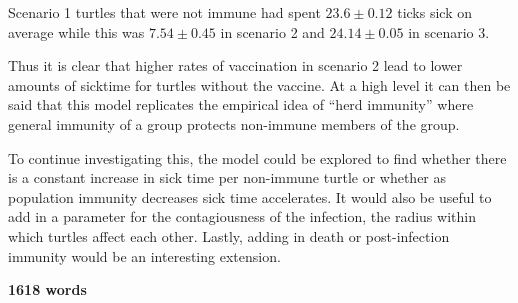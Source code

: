 \documentclass[11pt]{article} %
\begin{document}
Scenario 1 turtles that were not immune had spent $23.6 \pm 0.12$ ticks sick on average while this was $7.54 \pm 0.45$ in scenario 2 and $24.14 \pm 0.05$ in scenario 3. 

Thus it is clear that higher rates of vaccination in scenario 2 lead to lower amounts of sicktime for turtles without the vaccine. At a high level it can then be said that this model replicates the empirical idea of ``herd immunity'' where general immunity of a group protects non-immune members of the group. 

To continue investigating this, the model could be explored to find whether there is a constant increase in sick time per non-immune turtle or whether as population immunity decreases sick time accelerates. It would also be useful to add in a parameter for the contagiousness of the infection, the radius within which turtles affect each other. Lastly, adding in death or post-infection immunity would be an interesting extension. 


\textbf{1618 words}


\nocite{*}


\printbibliography
\end{document}
